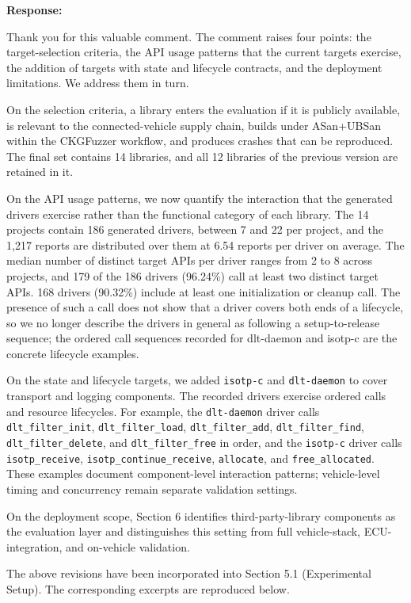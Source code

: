 \documentclass[onecolumn,11pt]{article}
\newcommand{\secr}[2]{\par\mySep \noindent \textsf{\textbf{#1 }}{#2}\par}
\newcommand{\mySep}{\vspace{8pt}}
\begin{document}
\secr{Response:}{Thank you for this valuable comment. The comment raises four points: the target-selection criteria, the API usage patterns that the current targets exercise, the addition of targets with state and lifecycle contracts, and the deployment limitations. We address them in turn.

On the selection criteria, a library enters the evaluation if it is publicly available, is relevant to the connected-vehicle supply chain, builds under ASan+UBSan within the CKGFuzzer workflow, and produces crashes that can be reproduced. The final set contains 14 libraries, and all 12 libraries of the previous version are retained in it.

On the API usage patterns, we now quantify the interaction that the generated drivers exercise rather than the functional category of each library. The 14 projects contain 186 generated drivers, between 7 and 22 per project, and the 1,217 reports are distributed over them at 6.54 reports per driver on average. The median number of distinct target APIs per driver ranges from 2 to 8 across projects, and 179 of the 186 drivers (96.24\%) call at least two distinct target APIs. 168 drivers (90.32\%) include at least one initialization or cleanup call. The presence of such a call does not show that a driver covers both ends of a lifecycle, so we no longer describe the drivers in general as following a setup-to-release sequence; the ordered call sequences recorded for dlt-daemon and isotp-c are the concrete lifecycle examples.

On the state and lifecycle targets, we added \texttt{isotp-c} and \texttt{dlt-daemon} to cover transport and logging components. The recorded drivers exercise ordered calls and resource lifecycles. For example, the \texttt{dlt-daemon} driver calls \texttt{dlt\_filter\_init}, \texttt{dlt\_filter\_load}, \texttt{dlt\_filter\_add}, \texttt{dlt\_filter\_find}, \texttt{dlt\_filter\_delete}, and \texttt{dlt\_filter\_free} in order, and the \texttt{isotp-c} driver calls \texttt{isotp\_receive}, \texttt{isotp\_continue\_receive}, \texttt{allocate}, and \texttt{free\_allocated}. These examples document component-level interaction patterns; vehicle-level timing and concurrency remain separate validation settings.

On the deployment scope, Section 6 identifies third-party-library components as the evaluation layer and distinguishes this setting from full vehicle-stack, ECU-integration, and on-vehicle validation.

The above revisions have been incorporated into Section 5.1 (Experimental Setup). The corresponding excerpts are reproduced below.}
\end{document}
